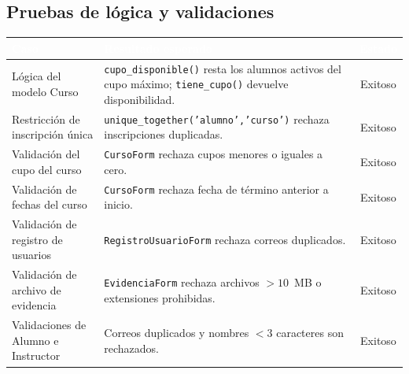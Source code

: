\documentclass[11pt,letterpaper]{article}
\newcommand{\headrowcolor}{\rowcolor{azulUAZ}}
\newcommand{\headcell}[1]{\textcolor{white}{\textbf{#1}}}
\begin{document}
	\subsection{Pruebas de l\'ogica y validaciones}
	\begin{center}\small
		\begin{tabularx}{\linewidth}{|p{4.2cm}|X|c|}
			\hline
			\headrowcolor \headcell{Caso} & \headcell{Resultado esperado} & \headcell{Estado} \\ \hline
			L\'ogica del modelo Curso & \texttt{cupo\_disponible()} resta los alumnos activos del cupo m\'aximo; \texttt{tiene\_cupo()} devuelve disponibilidad. & Exitoso \\ \hline
			\rowcolor{grisAlt}
			Restricci\'on de inscripci\'on \'unica & \texttt{unique\_together('alumno','curso')} rechaza inscripciones duplicadas. & Exitoso \\ \hline
			Validaci\'on del cupo del curso & \texttt{CursoForm} rechaza cupos menores o iguales a cero. & Exitoso \\ \hline
			\rowcolor{grisAlt}
			Validaci\'on de fechas del curso & \texttt{CursoForm} rechaza fecha de t\'ermino anterior a inicio. & Exitoso \\ \hline
			Validaci\'on de registro de usuarios & \texttt{RegistroUsuarioForm} rechaza correos duplicados. & Exitoso \\ \hline
			\rowcolor{grisAlt}
			Validaci\'on de archivo de evidencia & \texttt{EvidenciaForm} rechaza archivos $>10$~MB o extensiones prohibidas. & Exitoso \\ \hline
			Validaciones de Alumno e Instructor & Correos duplicados y nombres $<3$ caracteres son rechazados. & Exitoso \\ \hline
		\end{tabularx}
	\end{center}
	
\end{document}
